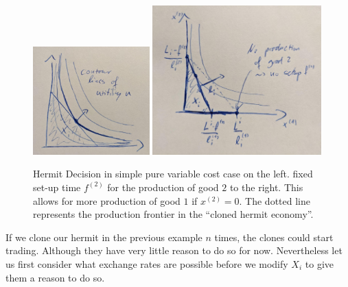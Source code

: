 \begin{figure}
	\includegraphics[width=0.4\textwidth]{images/hermit-decision-pure-variable.jpeg}
	\includegraphics[width=0.58\textwidth]{images/hermit-decision-setup-cost.jpeg}
	\caption{Hermit Decision in simple pure variable cost case on the left.
	fixed set-up time \(f^{(2)}\) for the production of good \(2\) to the right.
	This allows for more production of good \(1\) if \(x^{(2)}=0\). The dotted
	line represents the production frontier in the ``cloned hermit economy''.}
\end{figure}
\begin{example}
	If we clone our hermit in the previous example \(n\) times, the clones could
	start trading. Although they have very little reason to do so for now.
	Nevertheless let us first consider what exchange rates are possible before
	we modify \(X_i\) to give them a reason to do so.
\end{example}
